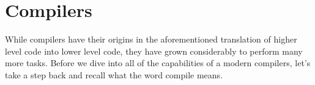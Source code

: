 
\section{Compilers}

While compilers have their origins in the aforementioned translation of higher level code into lower level code, they have grown considerably to perform many more tasks.
Before we dive into all of the capabilities of a modern compilers, let's take a step back and recall what the word compile means.

